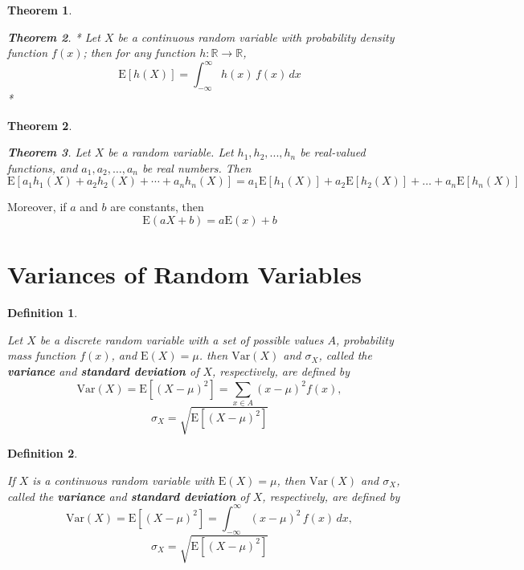 \documentclass[
]{book}
\newtheorem{theorem}{Theorem}[chapter]
\theoremstyle{definition}
\newtheorem{definition}{Definition}[chapter]
\theoremstyle{definition}
\theoremstyle{definition}
\theoremstyle{definition}
\theoremstyle{remark}
\begin{document}
\begin{theorem}
\protect\hypertarget{thm:unlabeled-div-8}{}\label{thm:unlabeled-div-8}

\textbf{Theorem 2}. * Let \(X\) be a continuous random variable with
probability density function \(f (x)\); then for any function
\(h: \mathbb{R} \rightarrow \mathbb{R}\),
\[\mathrm{E}[h(X)] = \int_{-\infty}^\infty h(x)\, f(x)\, dx\] *

\end{theorem}

\begin{theorem}
\protect\hypertarget{thm:unlabeled-div-9}{}\label{thm:unlabeled-div-9}

\textbf{Theorem 3}. \emph{Let \(X\) be a random variable. Let
\(h_1, h_2, . . . , h_n\) be real-valued functions, and
\(a_1, a_2, \ldots, a_n\) be real numbers. Then
\[\mathrm{E}[a_1 h_1(X) + a_2 h_2(X) + \cdots + a_n h_n(X)] = a_1 \mathrm{E}[h_1(X)] + a_2 \mathrm{E}[h_2(X)] + \ldots +
    a_n \mathrm{E}[h_n(X)]\]}

\end{theorem}

Moreover, if \(a\) and \(b\) are constants, then
\[\mathrm{E}(aX +b) = a\mathrm{E}(x) + b\]

\hypertarget{variances-of-random-variables}{%
\section{Variances of Random Variables}\label{variances-of-random-variables}}

\begin{definition}
\protect\hypertarget{def:unlabeled-div-10}{}\label{def:unlabeled-div-10}

\emph{Let \(X\) be a discrete random variable with a set of
possible values \(A\), probability mass function \(f(x)\), and
\(\mathrm{E}(X) = \mu\). then \(\mathrm{Var}(X)\) and \(\sigma_X\), called the
\textbf{variance} and \textbf{standard deviation} of \(X\), respectively, are
defined by
\[\mathrm{Var}(X) = \mathrm{E}[(X- \mu)^2] = \sum_{x \in A} (x - \mu)^2 f(x),\]
\[\sigma_X = \sqrt{\mathrm{E}[(X- \mu)^2]}\]}

\end{definition}

\begin{definition}
\protect\hypertarget{def:unlabeled-div-11}{}\label{def:unlabeled-div-11}

\emph{If \(X\) is a continuous random variable with
\(\mathrm{E}(X) = \mu\), then \(\mathrm{Var}(X)\) and \(\sigma_X\), called the
\textbf{variance} and \textbf{standard deviation} of \(X\), respectively, are
defined by
\[\mathrm{Var}(X) = \mathrm{E}[(X- \mu)^2] =  \int_{-\infty}^\infty (x - \mu)^2\, f(x)\, dx ,\]
\[\sigma_X = \sqrt{\mathrm{E}[(X- \mu)^2]}\]}

\end{definition}
\end{document}
